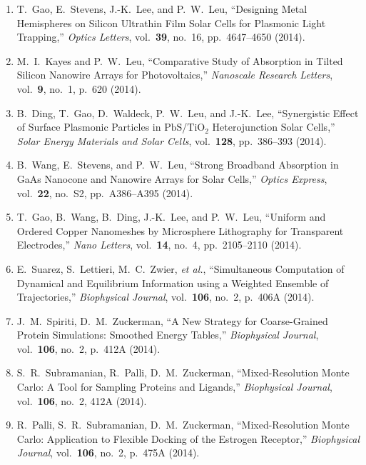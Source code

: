 \begin{enumerate}
\item T.\ Gao, E.\ Stevens, J.-K.\ Lee, and P.\ W.\ Leu, ``Designing Metal Hemispheres on Silicon Ultrathin Film Solar Cells for Plasmonic Light Trapping,'' \textit{Optics Letters}, vol.\ \textbf{39}, no.\ 16, pp.\ 4647--4650 (2014).

\item M.\ I.\ Kayes and P.\ W.\ Leu, ``Comparative Study of Absorption in Tilted Silicon Nanowire Arrays for Photovoltaics,'' \textit{Nanoscale Research Letters}, vol.\ \textbf{9}, no.\ 1, p.\ 620 (2014).

\item B.\ Ding, T.\ Gao, D.\ Waldeck, P.\ W.\ Leu, and J.-K.\ Lee, ``Synergistic Effect of Surface Plasmonic Particles in $\mathrm{Pb}\mathrm{S}$/$\mathrm{Ti}\mathrm{O}_2$ Heterojunction Solar Cells,'' \textit{Solar Energy Materials and Solar Cells}, vol.\ \textbf{128}, pp.\ 386--393 (2014).

\item B.\ Wang, E.\ Stevens, and P.\ W.\ Leu, ``Strong Broadband Absorption in GaAs Nanocone and Nanowire Arrays for Solar Cells,'' \textit{Optics Express}, vol.\ \textbf{22}, no.\ S2, pp.\ A386--A395 (2014).

\item T.\ Gao, B.\ Wang, B.\ Ding, J.-K.\ Lee, and P.\ W.\ Leu, ``Uniform and Ordered Copper Nanomeshes by Microsphere Lithography for Transparent Electrodes,'' \textit{Nano Letters}, vol.\ \textbf{14}, no.\ 4, pp.\ 2105--2110 (2014).

\item E.\ Suarez, S.\ Lettieri, M.\ C.\ Zwier, \textit{et al.}, ``Simultaneous Computation of Dynamical and Equilibrium Information using a Weighted Ensemble of Trajectories,'' \textit{Biophysical Journal}, vol.\ \textbf{106}, no.\ 2, p.\ 406A (2014).

\item J.\ M.\ Spiriti, D.\ M.\ Zuckerman, ``A New Strategy for Coarse-Grained Protein Simulations: Smoothed Energy Tables,'' \textit{Biophysical Journal}, vol.\ \textbf{106}, no.\ 2, p.\ 412A (2014).

\item S.\ R.\ Subramanian, R.\ Palli, D.\ M.\ Zuckerman, ``Mixed-Resolution Monte Carlo: A Tool for Sampling Proteins and Ligands,'' \textit{Biophysical Journal}, vol.\ \textbf{106}, no.\ 2, 412A (2014).

\item R.\ Palli, S.\ R.\ Subramanian, D.\ M.\ Zuckerman, ``Mixed-Resolution Monte Carlo: Application to Flexible Docking of the Estrogen Receptor,'' \textit{Biophysical Journal}, vol.\ \textbf{106}, no.\ 2, p.\ 475A (2014).


\end{enumerate}
